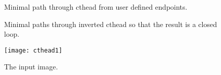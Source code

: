 \documentclass{InsightArticle}
\begin{document}
\begin{figure}[htbp]
\begin{center}
\caption{Minimal path through cthead from user defined endpoints.\label{fig:basicPathB}}
\end{center}
\end{figure}

\begin{figure}[htbp]
\begin{center}
\caption{Minimal paths through inverted cthead so that the result is a closed loop.\label{fig:basicPathM}}
\end{center}
\end{figure}


\begin{figure}[htbp]
\centering
\texttt{[image: cthead1]}
\caption{The input image.\label{cthead1}}
\end{figure}







\nocite{ITKSoftwareGuide}
\end{document}

